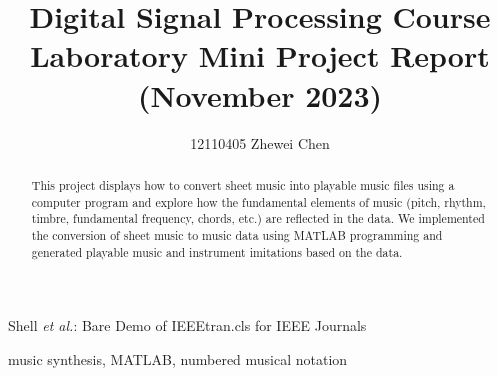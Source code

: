 \documentclass[journal]{IEEEtran}
\begin{document}
\title{\color[rgb]{0,0.6,1}Digital Signal Processing Course Laboratory Mini Project Report (November 2023)}

\author{12110405   Zhewei Chen}

{Shell \MakeLowercase{\textit{et al.}}: Bare Demo of IEEEtran.cls for IEEE Journals}
\maketitle

\begin{abstract}
   This project displays how to convert sheet music into playable music 
   files using a computer program and explore how the fundamental elements of music 
   (pitch, rhythm, timbre, fundamental frequency, chords, etc.) are reflected in the data. 
   We implemented the conversion of sheet music to music data using MATLAB programming and 
   generated playable music and instrument imitations based on the data.
\end{abstract}

\begin{IEEEkeywords}
   music synthesis, MATLAB, numbered musical notation
\end{IEEEkeywords}


\IEEEpeerreviewmaketitle
\end{document}
